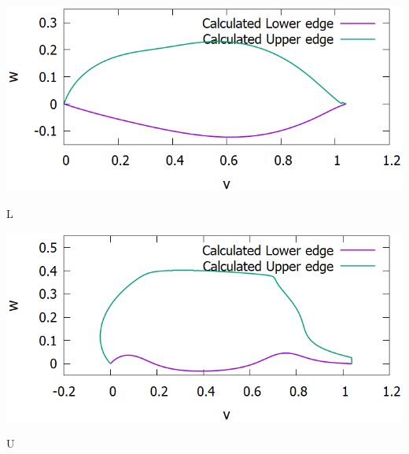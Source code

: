 \documentclass[11pt]{jsarticle}
\begin{document}
	\bfig[H]
		\centering
		\includegraphics[width=0.6\columnwidth]{./figure/Measure/ObtainedPatternL.png}
		\caption{L}
	\efig
	
	\bfig[H]
	\centering
	\includegraphics[width=0.6\columnwidth]{./figure/Measure/ObtainedPatternU.png}
	\caption{U}
	\efig
\end{document}
